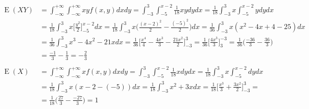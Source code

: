 \documentclass[tikz]{article}
\DeclareMathOperator{\Expected}{E}
\begin{document}
\begin{align*}
  \Expected(XY)&=\int_{-\infty}^{+\infty}\int_{-\infty}^{+\infty}xyf(x,y)dxdy=\int_{-3}^3\int_{-5}^{x-2}\frac{1}{18}xydydx=\frac{1}{18}\int_{-3}^3x\int_{-5}^{x-2}ydydx \\
               &=\frac{1}{18}\int_{-3}^3x\bigg[\frac{y^2}{2}\bigg]_{-5}^{x-2}dx=\frac{1}{18}\int_{-3}^3x\bigg(\frac{(x-2)^2}{2}-\frac{(-5)^2}{2}\bigg)dx=\frac{1}{36}\int_{-3}^3x(x^2-4x+4-25)dx \\
               &=\frac{1}{36}\int_{-3}^3x^3-4x^2-21xdx=\frac{1}{36}\bigg[\frac{x^4}{4}-\frac{4x^3}{3}-\frac{21x^2}{2}\bigg]_{-3}^3=\frac{1}{36}\bigg[\frac{4x^3}{3}\bigg]_3^{-3}=\frac{1}{36}\bigg(\frac{-36}{3}-\frac{36}{3}\bigg) \\
               &=\frac{-1}{3}-\frac{1}{3}=-\frac{2}{3} \\
  ~\\
  \Expected(X)&=\int_{-\infty}^{+\infty}\int_{-\infty}^{+\infty}xf(x,y)dxdy=\int_{-3}^3\int_{-5}^{x-2}\frac{1}{18}xdydx=\frac{1}{18}\int_{-3}^3x\int_{-5}^{x-2}dydx \\
              &=\frac{1}{18}\int_{-3}^3x(x-2-(-5))dx=\frac{1}{18}\int_{-3}^{3}x^2+3xdx=\frac{1}{18}\bigg[\frac{x^3}{3}+\frac{3x^2}{2}\bigg]_{-3}^3= \\
  &=\frac{1}{18}\bigg(\frac{27}{3}-\frac{-27}{3}\bigg)=1
\end{align*}
\end{document}
